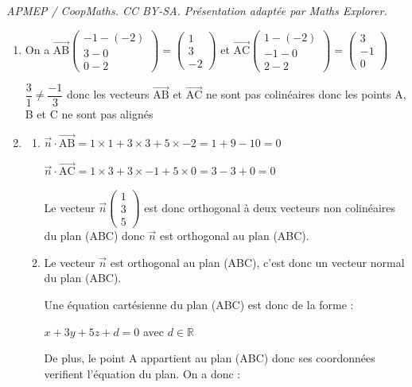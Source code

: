 \documentclass[10pt]{article}
\providecommand{\R}{\mathbb{R}}
\providecommand{\vect}[1]{\overrightarrow{#1}}
\begin{document}
\noindent\textit{APMEP / CoopMaths. CC BY-SA. Présentation adaptée par Maths Explorer.}\par\medskip
\medskip

\begin{enumerate}
	\item

On a $ \vect{\mathrm{AB}}  \begin{pmatrix}	-1 - (-2)\\ 3-0 \\ 0-2 \end{pmatrix} = \begin{pmatrix}	1\\ 3 \\ -2 \end{pmatrix}$
	et $ \vect{\mathrm{AC}}  \begin{pmatrix}	1 - (-2)\\ -1-0 \\ 2-2 \end{pmatrix} = \begin{pmatrix}	3\\ -1 \\ 0 \end{pmatrix}$

$\dfrac{3}{1}\neq \dfrac{-1}{3}$ donc les vecteurs  $ \vect{\mathrm{AB}} $ et  $ \vect{\mathrm{AC}} $ ne sont pas colinéaires donc les points A, B et C ne sont pas alignés
		\item
		\begin{enumerate}
			\item
$\vect{n} \cdot \vect{\mathrm{AB}}= 1 \times 1 + 3 \times 3 + 5 \times -2 = 1 +9 -10=0$

$\vect{n} \cdot \vect{\mathrm{AC}}= 1 \times 3 + 3 \times -1 + 5 \times 0 =3-3+0=0$

Le vecteur $\vect{n}\begin{pmatrix}1 \\ 3 \\ 5\end{pmatrix}$ est donc orthogonal à deux vecteurs non colinéaires du plan (ABC) donc $\vect{n}$ est orthogonal au plan (ABC).

		\item  Le vecteur $\vect{n}$ est orthogonal au plan (ABC), c'est donc un vecteur normal du plan (ABC).

Une équation cartésienne du plan (ABC) est donc de la forme :

$x+3y+5z+d=0$ avec $d\in\R$

De plus, le point A appartient au plan (ABC) donc ses coordonnées verifient l'équation du plan. On a donc :


\end{enumerate}
\end{enumerate}
\end{document}
